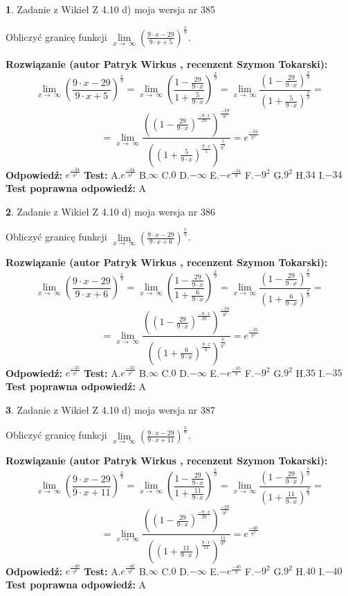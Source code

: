 \documentclass[12pt, a4paper]{article}
\theoremstyle{definition} %
\newtheorem{zad}{}
\newcommand{\zadStart}[1]{\begin{zad}#1\newline}
\newcommand{\zadStop}{\end{zad}}
\newcommand{\rozwStart}[2]{\noindent \textbf{Rozwiązanie (autor #1 , recenzent #2): }\newline}
\newcommand{\rozwStop}{\newline}
\newcommand{\odpStart}{\noindent \textbf{Odpowiedź:}\newline}
\newcommand{\odpStop}{\newline}
\newcommand{\testStart}{\noindent \textbf{Test:}\newline}
\newcommand{\testStop}{\newline}
\newcommand{\kluczStart}{\noindent \textbf{Test poprawna odpowiedź:}\newline}
\newcommand{\kluczStop}{\newline}
\begin{document}
\zadStart{Zadanie z Wikieł Z 4.10 d) moja wersja nr 385}


Obliczyć granicę funkcji  $\lim\limits_{x\to\ \infty}(\frac{9\cdot x-29}{9\cdot x+5})^{\frac{x}{9}}$.
\zadStop
\rozwStart{Patryk Wirkus}{Szymon Tokarski}
$$\lim\limits_{x\to\ \infty}(\frac{9\cdot x-29}{9\cdot x+5})^{\frac{x}{9}} = \lim\limits_{x\to\ \infty}(\frac{1-\frac{29}{9\cdot x}}{1+\frac{5}{9\cdot x}})^{\frac{x}{9}}=\lim\limits_{x\to\ \infty}\frac{(1-\frac{29}{9\cdot x})^{\frac{x}{9}}}{(1+\frac{5}{9\cdot x})^{\frac{x}{9}}}=$$
$$=\lim\limits_{x\to\ \infty}\frac{((1-\frac{29}{9\cdot x})^{\frac{-9\cdot x}{29}})^{\frac{-29}{9^{2}}}}{((1+\frac{5}{9\cdot x})^{\frac{9\cdot x}{5}})^{\frac{5}{9^{2}}}}=e^{\frac{-34}{9^{2}}}$$
\rozwStop
\odpStart
$e^{\frac{-34}{9^{2}}}$
\odpStop
\testStart
A.$e^{\frac{-34}{9^{2}}}$ B.$\infty$ C.$0$ D.$-\infty$ E.$-e^{\frac{-34}{9}}$
F.$-9^{2}$ G.$9^{2}$
H.$34$
I.$-34$
\testStop
\kluczStart
A
\kluczStop



\zadStart{Zadanie z Wikieł Z 4.10 d) moja wersja nr 386}


Obliczyć granicę funkcji  $\lim\limits_{x\to\ \infty}(\frac{9\cdot x-29}{9\cdot x+6})^{\frac{x}{9}}$.
\zadStop
\rozwStart{Patryk Wirkus}{Szymon Tokarski}
$$\lim\limits_{x\to\ \infty}(\frac{9\cdot x-29}{9\cdot x+6})^{\frac{x}{9}} = \lim\limits_{x\to\ \infty}(\frac{1-\frac{29}{9\cdot x}}{1+\frac{6}{9\cdot x}})^{\frac{x}{9}}=\lim\limits_{x\to\ \infty}\frac{(1-\frac{29}{9\cdot x})^{\frac{x}{9}}}{(1+\frac{6}{9\cdot x})^{\frac{x}{9}}}=$$
$$=\lim\limits_{x\to\ \infty}\frac{((1-\frac{29}{9\cdot x})^{\frac{-9\cdot x}{29}})^{\frac{-29}{9^{2}}}}{((1+\frac{6}{9\cdot x})^{\frac{9\cdot x}{6}})^{\frac{6}{9^{2}}}}=e^{\frac{-35}{9^{2}}}$$
\rozwStop
\odpStart
$e^{\frac{-35}{9^{2}}}$
\odpStop
\testStart
A.$e^{\frac{-35}{9^{2}}}$ B.$\infty$ C.$0$ D.$-\infty$ E.$-e^{\frac{-35}{9}}$
F.$-9^{2}$ G.$9^{2}$
H.$35$
I.$-35$
\testStop
\kluczStart
A
\kluczStop



\zadStart{Zadanie z Wikieł Z 4.10 d) moja wersja nr 387}


Obliczyć granicę funkcji  $\lim\limits_{x\to\ \infty}(\frac{9\cdot x-29}{9\cdot x+11})^{\frac{x}{9}}$.
\zadStop
\rozwStart{Patryk Wirkus}{Szymon Tokarski}
$$\lim\limits_{x\to\ \infty}(\frac{9\cdot x-29}{9\cdot x+11})^{\frac{x}{9}} = \lim\limits_{x\to\ \infty}(\frac{1-\frac{29}{9\cdot x}}{1+\frac{11}{9\cdot x}})^{\frac{x}{9}}=\lim\limits_{x\to\ \infty}\frac{(1-\frac{29}{9\cdot x})^{\frac{x}{9}}}{(1+\frac{11}{9\cdot x})^{\frac{x}{9}}}=$$
$$=\lim\limits_{x\to\ \infty}\frac{((1-\frac{29}{9\cdot x})^{\frac{-9\cdot x}{29}})^{\frac{-29}{9^{2}}}}{((1+\frac{11}{9\cdot x})^{\frac{9\cdot x}{11}})^{\frac{11}{9^{2}}}}=e^{\frac{-40}{9^{2}}}$$
\rozwStop
\odpStart
$e^{\frac{-40}{9^{2}}}$
\odpStop
\testStart
A.$e^{\frac{-40}{9^{2}}}$ B.$\infty$ C.$0$ D.$-\infty$ E.$-e^{\frac{-40}{9}}$
F.$-9^{2}$ G.$9^{2}$
H.$40$
I.$-40$
\testStop
\kluczStart
A
\kluczStop
\end{document}
